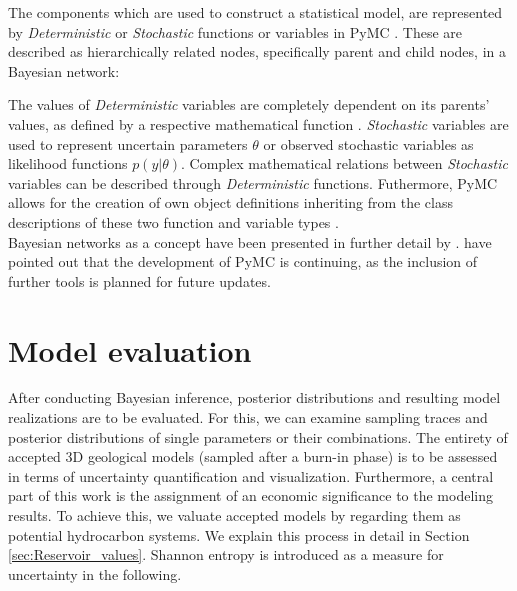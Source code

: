 		The components which are used to construct a statistical model, are represented by \textit{Deterministic} or \textit{Stochastic} functions or variables in PyMC \citep{salvatier2016pymc3}. These are described as hierarchically related nodes, specifically parent and child nodes, in a Bayesian network:
		The values of \textit{Deterministic} variables are completely dependent on its parents' values, as defined by a respective mathematical function \citep{salvatier2016pymc3}. \textit{Stochastic} variables are used to represent uncertain parameters $\theta$ or observed stochastic variables as likelihood functions $p(y|\theta)$. Complex mathematical relations between \textit{Stochastic} variables can be described through \textit{Deterministic} functions. Futhermore, PyMC allows for the creation of own object definitions inheriting from the class descriptions of these two function and variable types \citep{salvatier2016pymc3, delaVarga2016}.\\
		Bayesian networks as a concept have been presented in further detail by \citet{koller2009probabilistic}. \citet{salvatier2016pymc3} have pointed out that the development of PyMC is continuing, as the inclusion of further tools is planned for future updates.
		
		
		\section{Model evaluation}\label{sec:model_evaluation}
        After conducting Bayesian inference, posterior distributions and resulting model realizations are to be evaluated. For this, we can examine sampling traces and posterior distributions of single parameters or their combinations. The entirety of accepted 3D geological models (sampled after a burn-in phase) is to be assessed in terms of uncertainty quantification and visualization. Furthermore, a central part of this work is the assignment of an economic significance to the modeling results. To achieve this, we valuate accepted models by regarding them as potential hydrocarbon systems. We explain this process in detail in Section \ref{sec:Reservoir_values}. Shannon entropy is introduced as a measure for uncertainty in the following.
        
